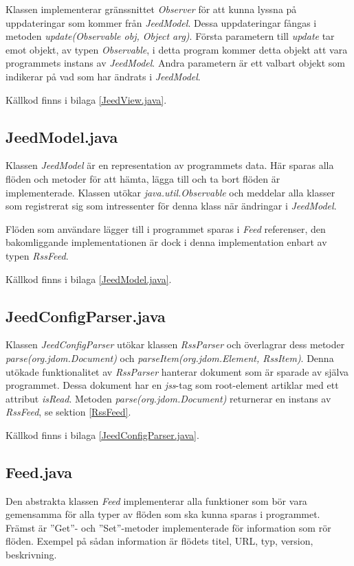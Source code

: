 \documentclass[titlepage, twoside, a4paper, 12pt]{article}
\begin{document}
Klassen implementerar gränssnittet \textit{Observer} för att kunna
lyssna på uppdateringar som kommer från \textit{JeedModel}. Dessa
uppdateringar fångas i metoden \textit{update(Observable obj, Object
  arg)}. Första parametern till \textit{update} tar emot objekt, av
typen \textit{Observable}, i detta program kommer detta objekt att
vara programmets instans av \textit{JeedModel}. Andra parametern är
ett valbart objekt som indikerar på vad som har ändrats i
\textit{JeedModel}. %

Källkod finns i bilaga \ref{JeedView.java}.

\subsection{JeedModel.java}\label{JeedModel}
Klassen \textit{JeedModel} är en representation av programmets
data. Här sparas alla flöden och metoder för att hämta, lägga till och
ta bort flöden är implementerade. Klassen utökar
\textit{java.util.Observable} och meddelar alla klasser som
registrerat sig som intressenter för denna klass när ändringar i
\textit{JeedModel}.

Flöden som användare lägger till i programmet sparas i \textit{Feed}
referenser, den bakomliggande implementationen är dock i denna
implementation enbart av typen \textit{RssFeed}.


Källkod finns i bilaga \ref{JeedModel.java}.

\subsection{JeedConfigParser.java}\label{JeedConfigParser}
Klassen \textit{JeedConfigParser} utökar klassen \textit{RssParser}
och överlagrar dess metoder \textit{parse(org.jdom.Document)} och
\textit{parseItem(org.jdom.Element, RssItem)}. Denna utökade
funktionalitet av \textit{RssParser} hanterar dokument som är sparade
av själva programmet. Dessa dokument har en \textit{jss}-tag som root-element
artiklar med ett attribut \textit{isRead}. Metoden
\textit{parse(org.jdom.Document)} returnerar en instans av
\textit{RssFeed}, se sektion \ref{RssFeed}.

Källkod finns i bilaga \ref{JeedConfigParser.java}.

\subsection{Feed.java}\label{Feed}
Den abstrakta klassen \textit{Feed} implementerar alla funktioner som
bör vara gemensamma för alla typer av flöden som ska kunna sparas i
programmet. Främst är ''Get''- och ''Set''-metoder implementerade för
information som rör flöden. Exempel på sådan information är flödets
titel, URL, typ, version, beskrivning.
\end{document}
